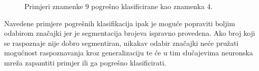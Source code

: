 \begin{figure}[htb]
    \centering
    \caption{Primjeri znamenke $9$ pogrešno klasificirane kao znamenka $4$.}
    \label{fig:missclassified-9-as-4}
\end{figure}
Navedene primjere pogrešnih klasifikacija ipak je moguće popraviti boljim odabirom značajki jer je segmentacija brojeva
ispravno provedena. Ako broj koji se raspoznaje nije dobro segmentiran, nikakav odabir značajki neće pružati mogućnost
raspoznavanja kroz generalizaciju te će u tim slučajevima neuronska mreža zapamtiti primjer ili ga pogrešno
klasificirati.

